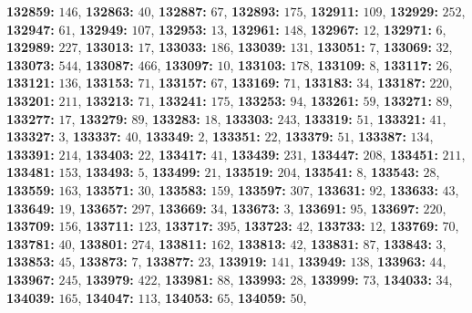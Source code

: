 \textsf{\bfseries 132859:} $146$, \textsf{\bfseries 132863:} $40$, \textsf{\bfseries 132887:} $67$, \textsf{\bfseries 132893:} $175$, \textsf{\bfseries 132911:} $109$, \textsf{\bfseries 132929:} $252$, \textsf{\bfseries 132947:} $61$, \textsf{\bfseries 132949:} $107$, \textsf{\bfseries 132953:} $13$, \textsf{\bfseries 132961:} $148$, \textsf{\bfseries 132967:} $12$, \textsf{\bfseries 132971:} $6$, \textsf{\bfseries 132989:} $227$, \textsf{\bfseries 133013:} $17$, \textsf{\bfseries 133033:} $186$, \textsf{\bfseries 133039:} $131$, \textsf{\bfseries 133051:} $7$, \textsf{\bfseries 133069:} $32$, \textsf{\bfseries 133073:} $544$, \textsf{\bfseries 133087:} $466$, \textsf{\bfseries 133097:} $10$, \textsf{\bfseries 133103:} $178$, \textsf{\bfseries 133109:} $8$, \textsf{\bfseries 133117:} $26$, \textsf{\bfseries 133121:} $136$, \textsf{\bfseries 133153:} $71$, \textsf{\bfseries 133157:} $67$, \textsf{\bfseries 133169:} $71$, \textsf{\bfseries 133183:} $34$, \textsf{\bfseries 133187:} $220$, \textsf{\bfseries 133201:} $211$, \textsf{\bfseries 133213:} $71$, \textsf{\bfseries 133241:} $175$, \textsf{\bfseries 133253:} $94$, \textsf{\bfseries 133261:} $59$, \textsf{\bfseries 133271:} $89$, \textsf{\bfseries 133277:} $17$, \textsf{\bfseries 133279:} $89$, \textsf{\bfseries 133283:} $18$, \textsf{\bfseries 133303:} $243$, \textsf{\bfseries 133319:} $51$, \textsf{\bfseries 133321:} $41$, \textsf{\bfseries 133327:} $3$, \textsf{\bfseries 133337:} $40$, \textsf{\bfseries 133349:} $2$, \textsf{\bfseries 133351:} $22$, \textsf{\bfseries 133379:} $51$, \textsf{\bfseries 133387:} $134$, \textsf{\bfseries 133391:} $214$, \textsf{\bfseries 133403:} $22$, \textsf{\bfseries 133417:} $41$, \textsf{\bfseries 133439:} $231$, \textsf{\bfseries 133447:} $208$, \textsf{\bfseries 133451:} $211$, \textsf{\bfseries 133481:} $153$, \textsf{\bfseries 133493:} $5$, \textsf{\bfseries 133499:} $21$, \textsf{\bfseries 133519:} $204$, \textsf{\bfseries 133541:} $8$, \textsf{\bfseries 133543:} $28$, \textsf{\bfseries 133559:} $163$, \textsf{\bfseries 133571:} $30$, \textsf{\bfseries 133583:} $159$, \textsf{\bfseries 133597:} $307$, \textsf{\bfseries 133631:} $92$, \textsf{\bfseries 133633:} $43$, \textsf{\bfseries 133649:} $19$, \textsf{\bfseries 133657:} $297$, \textsf{\bfseries 133669:} $34$, \textsf{\bfseries 133673:} $3$, \textsf{\bfseries 133691:} $95$, \textsf{\bfseries 133697:} $220$, \textsf{\bfseries 133709:} $156$, \textsf{\bfseries 133711:} $123$, \textsf{\bfseries 133717:} $395$, \textsf{\bfseries 133723:} $42$, \textsf{\bfseries 133733:} $12$, \textsf{\bfseries 133769:} $70$, \textsf{\bfseries 133781:} $40$, \textsf{\bfseries 133801:} $274$, \textsf{\bfseries 133811:} $162$, \textsf{\bfseries 133813:} $42$, \textsf{\bfseries 133831:} $87$, \textsf{\bfseries 133843:} $3$, \textsf{\bfseries 133853:} $45$, \textsf{\bfseries 133873:} $7$, \textsf{\bfseries 133877:} $23$, \textsf{\bfseries 133919:} $141$, \textsf{\bfseries 133949:} $138$, \textsf{\bfseries 133963:} $44$, \textsf{\bfseries 133967:} $245$, \textsf{\bfseries 133979:} $422$, \textsf{\bfseries 133981:} $88$, \textsf{\bfseries 133993:} $28$, \textsf{\bfseries 133999:} $73$, \textsf{\bfseries 134033:} $34$, \textsf{\bfseries 134039:} $165$, \textsf{\bfseries 134047:} $113$, \textsf{\bfseries 134053:} $65$, \textsf{\bfseries 134059:} $50$, 
